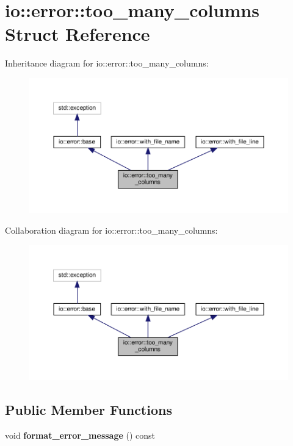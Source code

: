 \hypertarget{structio_1_1error_1_1too__many__columns}{}\section{io\+:\+:error\+:\+:too\+\_\+many\+\_\+columns Struct Reference}
\label{structio_1_1error_1_1too__many__columns}


Inheritance diagram for io\+:\+:error\+:\+:too\+\_\+many\+\_\+columns\+:\nopagebreak
\begin{figure}[H]
\begin{center}
\leavevmode
\includegraphics[width=350pt]{structio_1_1error_1_1too__many__columns__inherit__graph}
\end{center}
\end{figure}


Collaboration diagram for io\+:\+:error\+:\+:too\+\_\+many\+\_\+columns\+:\nopagebreak
\begin{figure}[H]
\begin{center}
\leavevmode
\includegraphics[width=350pt]{structio_1_1error_1_1too__many__columns__coll__graph}
\end{center}
\end{figure}
\subsection*{Public Member Functions}
\begin{DoxyCompactItemize}
\item 
\mbox{\label{structio_1_1error_1_1too__many__columns_a2072af07b0408387579becc076a9809e}} 
void {\bfseries format\+\_\+error\+\_\+message} () const
\end{DoxyCompactItemize}
